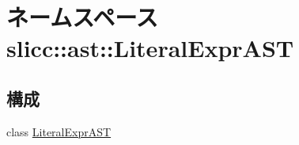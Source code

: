 \hypertarget{namespaceslicc_1_1ast_1_1LiteralExprAST}{
\section{ネームスペース slicc::ast::LiteralExprAST}
\label{namespaceslicc_1_1ast_1_1LiteralExprAST}
}
\subsection*{構成}
\begin{DoxyCompactItemize}
\item 
class \hyperlink{classslicc_1_1ast_1_1LiteralExprAST_1_1LiteralExprAST}{LiteralExprAST}
\end{DoxyCompactItemize}
